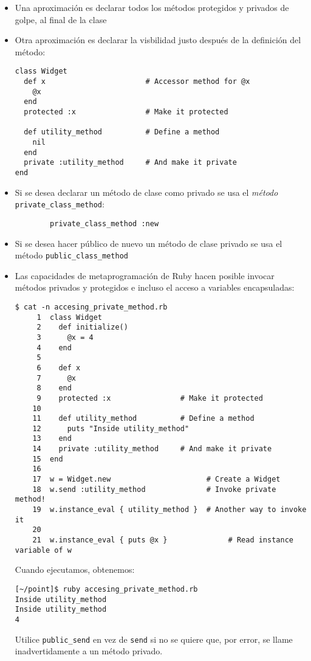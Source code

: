 \begin{itemize}
\item Una aproximación es declarar todos los métodos protegidos y privados de golpe,
al final de la clase

\item Otra aproximación es declarar la visbilidad justo después de la definición del método:
\begin{verbatim}
class Widget
  def x                       # Accessor method for @x
    @x
  end
  protected :x                # Make it protected

  def utility_method          # Define a method
    nil
  end
  private :utility_method     # And make it private
end
\end{verbatim}
\item Si se desea declarar un método de clase como privado se usa el \emph{método}
\verb|private_class_method|:
\begin{verbatim}
        private_class_method :new
\end{verbatim}
\item Si se desea hacer público de nuevo un método de clase privado se usa el 
método \verb|public_class_method|
\item
Las capacidades de metaprogramación de Ruby hacen posible
invocar métodos privados y protegidos e incluso el acceso a variables 
encapsuladas:
\begin{verbatim}
$ cat -n accesing_private_method.rb 
     1  class Widget
     2    def initialize()
     3      @x = 4
     4    end
     5  
     6    def x
     7      @x
     8    end
     9    protected :x                # Make it protected
    10  
    11    def utility_method          # Define a method
    12      puts "Inside utility_method"
    13    end
    14    private :utility_method     # And make it private
    15  end
    16  
    17  w = Widget.new                      # Create a Widget
    18  w.send :utility_method              # Invoke private method!
    19  w.instance_eval { utility_method }  # Another way to invoke it
    20  
    21  w.instance_eval { puts @x }              # Read instance variable of w
\end{verbatim}
Cuando ejecutamos, obtenemos:
\begin{verbatim}
[~/point]$ ruby accesing_private_method.rb 
Inside utility_method
Inside utility_method
4
\end{verbatim}

Utilice \verb|public_send| en vez de \verb|send| si no se quiere que, 
por error, se llame inadvertidamente a un método privado.
\end{itemize}

